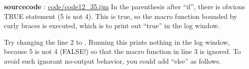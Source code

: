 \textbf{sourcecode} : \href{http://www.example.com/contents}{code/code12\_35.ijm}
In the parenthesis after ``if'', there is obvious TRUE statement (5 is not 4).
This is true, so the macro function bounded by curly braces is executed, which is to
print out ``true'' in the log window.

Try changing the line 2 to . Running this prints nothing
in the log window, because 5 is not 4 (FALSE!) so that the macro function in
line 3 is ignored. To avoid such ignorant no-output behavior, you could add
``else'' as follows.